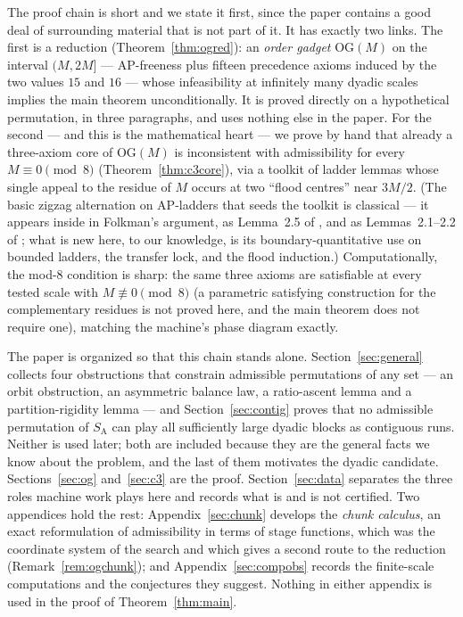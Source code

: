 \documentclass[11pt]{article}
\theoremstyle{definition}
\newcommand{\SA}{S_{\mathrm{A}}}
\newcommand{\OG}{\mathrm{OG}}
\begin{document}
The proof chain is short and we state it first, since the paper contains a
good deal of surrounding material that is not part of it. It has exactly
two links. The first is a reduction (Theorem~\ref{thm:ogred}): an
\emph{order gadget} $\OG(M)$ on the interval $(M, 2M]$ --- AP-freeness plus
fifteen precedence axioms induced by the two values $15$ and $16$ --- whose
infeasibility at infinitely many dyadic scales implies the main theorem
unconditionally. It is proved directly on a hypothetical permutation, in
three paragraphs, and uses nothing else in the paper.
For the second --- and this is the mathematical heart --- we
prove by hand that already a three-axiom core of $\OG(M)$ is inconsistent
with admissibility for every $M \equiv 0 \pmod 8$ (Theorem~\ref{thm:c3core}),
via a toolkit of ladder lemmas whose single appeal to the residue of $M$
occurs at two ``flood centres'' near $3M/2$. (The basic zigzag alternation
on AP-ladders that seeds the toolkit is classical --- it appears inside
\cite{DEGS77} in Folkman's argument, as Lemma~2.5 of \cite{HS24}, and as
Lemmas~2.1--2.2 of \cite{Gen26}; what is new here, to our knowledge, is its
boundary-quantitative
use on bounded ladders, the transfer lock, and the flood induction.) Computationally, the mod-$8$ condition is sharp:
the same three axioms are satisfiable at every tested scale with
$M \not\equiv 0 \pmod 8$ (a parametric satisfying construction for the
complementary residues is not proved here, and the main theorem does not
require one),
matching the machine's phase diagram exactly.

The paper is organized so that this chain stands alone.
Section~\ref{sec:general} collects four obstructions that constrain
admissible permutations of any set --- an orbit obstruction, an asymmetric
balance law, a ratio-ascent lemma and a partition-rigidity lemma --- and
Section~\ref{sec:contig} proves that no admissible permutation of $\SA$ can
play all sufficiently large dyadic blocks as contiguous runs. Neither is
used later; both are included because they are the general facts we know
about the problem, and the last of them motivates the dyadic candidate.
Sections~\ref{sec:og} and~\ref{sec:c3} are the proof.
Section~\ref{sec:data} separates the three roles machine work plays here
and records what is and is not certified. Two appendices hold the rest:
Appendix~\ref{sec:chunk} develops the \emph{chunk calculus}, an exact
reformulation of admissibility in terms of stage functions, which was the
coordinate system of the search and which gives a second route to the
reduction (Remark~\ref{rem:ogchunk}); and
Appendix~\ref{sec:compobs} records the finite-scale computations and the
conjectures they suggest. Nothing in either appendix is used in the proof
of Theorem~\ref{thm:main}.
\end{document}
